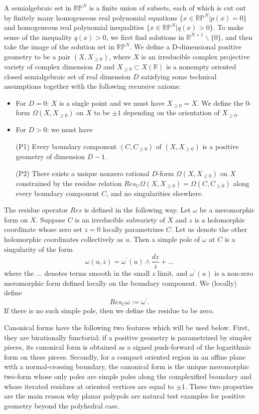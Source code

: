 \documentclass[10pt,a4paper,reqno]{amsart}
\newcommand {\bR} {\mathbb R}
\newcommand {\bRP} {\mathbb {RP}}
\theoremstyle{plain}
\theoremstyle{definition}
\begin{document}
A semialgebraic set in $\bRP^N$ is a finite union of subsets, each of which is cut out by finitely many homogeneous real polynomial equations $\{x \in \bRP^N | p(x) = 0\}$ and homogeneous real polynomial inequalities 
$\{x \in \bRP^N | q(x) > 0\}$. To make sense of the inequality $q(x) > 0$, we first find solutions in $\bR^{N +1}\backslash\{0\}$, and then take the image of the solution set in $\bRP^N$.
We define a D-dimensional positive geometry to be a pair $(X,X_{\ge 0})$, where $X$ is an irreducible complex projective variety of complex dimension $D$ and $X_{\ge 0} \subset X(\bR)$ is a nonempty oriented closed semialgebraic set of real dimension $D$ satisfying some technical assumptions %
together with the following recursive axioms:
\begin{itemize}
\item For $D=0$: $X$ is a single point and we must have $X_{\ge 0} =X$. We define the $0$-form $\Omega(X,X_{\ge 0})$ on $X$ to be $\pm 1$ depending on the orientation of $X_{\ge 0}$.
\item For $D>0$: we must have

(P1) Every boundary component $(C,C_{\ge 0})$ of $(X,X_{\ge 0})$ is a positive geometry of dimension $D-1$.

(P2) There exists a unique nonzero rational $D$-form $\Omega(X,X_{\ge 0})$ on $X$ constrained by the residue relation $Res_C \Omega(X, X_{\ge 0}) = \Omega(C, C_{\ge 0})$ along every boundary component $C$, and no singularities elsewhere.
\end{itemize}

The residue operator $Res$ is defined in the following way. Let $\omega$ be a meromorphic form on $X$. Suppose $C$ is an irreducible subvariety of $X$ and $z$ is a holomorphic coordinate whose zero set $z = 0$ locally parametrizes $C$. Let us denote the other holomorphic coordinates collectively as $u$. Then a simple pole of $\omega$ at $C$ is a singularity of the form
$$\omega(u, z) = \omega^\prime(u) \wedge \frac{dz}{z}+ \dots $$
where the $\dots$ denotes terms smooth in the small $z$ limit, and $\omega^\prime(u)$ is a non-zero meromorphic form defined locally on the boundary component. We (locally) define
$$Res_C \omega := \omega^\prime.$$
 If there is no such simple pole, then we define the residue to be zero.
 
 Canonical forms have the following two features which will be used below.  First, they are birationally functorial: if a positive geometry is parametrized by simpler pieces, its canonical form is obtained as a signed push-forward of the logarithmic form on these pieces.  Secondly, for a compact oriented region in an affine plane with a normal-crossing boundary, the canonical form is the unique meromorphic two-form whose only poles are simple poles along the complexified boundary and whose iterated residues at oriented vertices are equal to $\pm 1$.  These two properties are the main reason why planar polypols are natural test examples for positive geometry beyond the polyhedral case.
 
\end{document}

